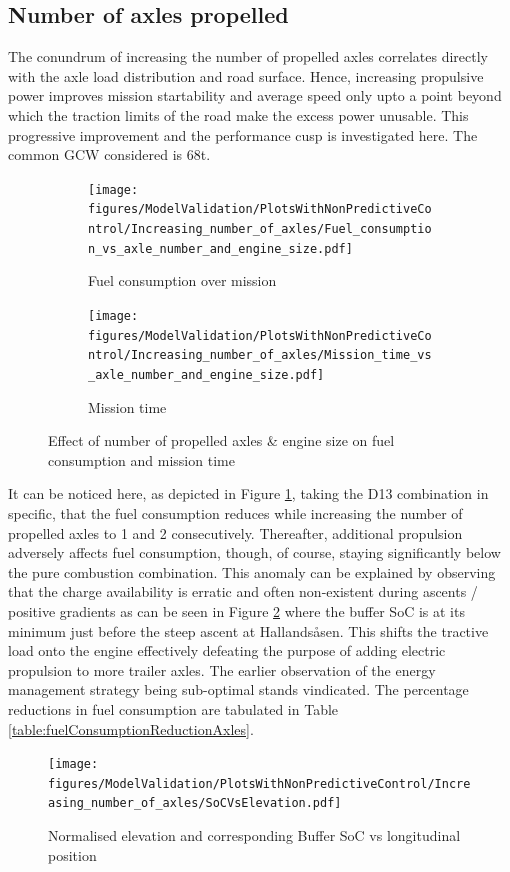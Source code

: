 \documentclass[ExampleMasters.tex]{subfiles}
\begin{document}
\subsection{Number of axles propelled}
The conundrum of increasing the number of propelled axles correlates directly with the axle load distribution and road surface. Hence, increasing propulsive power improves mission startability and average speed only upto a point beyond which the traction limits of the road make the excess power unusable. This progressive improvement and the performance cusp is investigated here. The common GCW considered is 68t.\\
\begin{figure}[h!]
\begin{subfigure}{.5\textwidth}
\centering
\texttt{[image: figures/ModelValidation/PlotsWithNonPredictiveControl/Increasing\_number\_of\_axles/Fuel\_consumption\_vs\_axle\_number\_and\_engine\_size.pdf]}
\caption{Fuel consumption over mission}
\end{subfigure}
\begin{subfigure}{.5\textwidth}
\centering
\texttt{[image: figures/ModelValidation/PlotsWithNonPredictiveControl/Increasing\_number\_of\_axles/Mission\_time\_vs\_axle\_number\_and\_engine\_size.pdf]}
\caption{Mission time}
\end{subfigure}
\caption{Effect of number of propelled axles \& engine size on fuel consumption and mission time}
\label{timeFuelNumberOfAxlesEngine}
\end{figure}
It can be noticed here, as depicted in Figure \ref{timeFuelNumberOfAxlesEngine}, taking the D13 combination in specific, that the fuel consumption reduces while increasing the number of propelled axles to 1 and 2 consecutively. Thereafter, additional propulsion adversely affects fuel consumption, though, of course, staying significantly below the pure combustion combination. This anomaly can be explained by observing that the charge availability is erratic and often non-existent during ascents / positive gradients as can be seen in Figure \ref{SoCVsPosition} where the buffer SoC is at its minimum just before the steep ascent at Hallands\aa sen. This shifts the tractive load onto the engine effectively defeating the purpose of adding electric propulsion to more trailer axles. The earlier observation of the energy management strategy being sub-optimal stands vindicated. The percentage reductions in fuel consumption are tabulated in Table \ref{table:fuelConsumptionReductionAxles}.\\
\begin{figure}[h!]
\texttt{[image: figures/ModelValidation/PlotsWithNonPredictiveControl/Increasing\_number\_of\_axles/SoCVsElevation.pdf]}
\caption{Normalised elevation and corresponding Buffer SoC vs longitudinal position}
\label{SoCVsPosition}
\end{figure}
\end{document}
